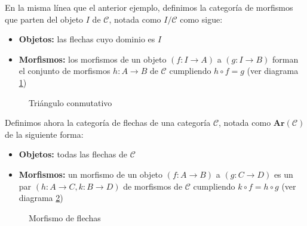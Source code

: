 \begin{ejemplo}
    En la misma línea que el anterior ejemplo, definimos la categoría de morfismos que parten del objeto $I$ de $\mathscr{C}$, notada como $I / \mathscr{C}$ como sigue: 
    \begin{itemize}
        \item \textbf{Objetos: } las flechas cuyo dominio es $I$
        \item \textbf{Morfismos: } los morfismos de un objeto $(f: I \longrightarrow A)$ a $(g: I \longrightarrow B)$ forman el conjunto de morfismos $h: A \longrightarrow B$ de $\mathscr{C}$ cumpliendo $h \circ f = g$ (ver diagrama \ref{diag:traingulo_desde})
    \end{itemize}
\end{ejemplo}

\begin{figure}[htpb]
    \centering
    \caption{Triángulo conmutativo}
    \label{diag:traingulo_desde}
\end{figure}

\begin{ejemplo}
    Definimos ahora la categoría de flechas de una categoría $\mathscr{C}$, notada como $\textbf{Ar}(\mathscr{C})$ de la siguiente forma:
    \begin{itemize}
        \item \textbf{Objetos: } todas las flechas de $\mathscr{C}$
        \item \textbf{Morfismos: } un morfismo de un objeto $(f: A \longrightarrow B)$ a $(g: C \longrightarrow D)$ es un par $(h: A \longrightarrow C, k: B \longrightarrow D)$ de morfismos de $\mathscr{C}$ cumpliendo $k \circ f = h \circ g$ (ver diagrama \ref{diag:diagrama-flechas})
    \end{itemize}
\end{ejemplo}

\begin{figure}[htpb] %
    \centering
    \caption{Morfismo de flechas}
    \label{diag:diagrama-flechas}
\end{figure}

